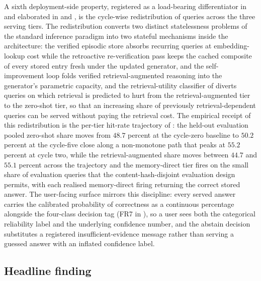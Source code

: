A sixth deployment-side property, registered as a load-bearing differentiator in  and elaborated in  and , is the cycle-wise redistribution of queries across the three serving tiers. The redistribution converts two distinct statelessness problems of the standard inference paradigm into two stateful mechanisms inside the architecture: the verified episodic store absorbs recurring queries at embedding-lookup cost while the retroactive re-verification pass keeps the cached composite of every stored entry fresh under the updated generator, and the self-improvement loop folds verified retrieval-augmented reasoning into the generator's parametric capacity, and the retrieval-utility classifier of  diverts queries on which retrieval is predicted to hurt from the retrieval-augmented tier to the zero-shot tier, so that an increasing share of previously retrieval-dependent queries can be served without paying the retrieval cost. The empirical receipt of this redistribution is the per-tier hit-rate trajectory of : the held-out evaluation pooled zero-shot share moves from $48.7$ percent at the cycle-zero baseline to $50.2$ percent at the cycle-five close along a non-monotone path that peaks at $55.2$ percent at cycle two, while the retrieval-augmented share moves between $44.7$ and $55.1$ percent across the trajectory and the memory-direct tier fires on the small share of evaluation queries that the content-hash-disjoint evaluation design permits, with each realised memory-direct firing returning the correct stored answer. The user-facing surface mirrors this discipline: every served answer carries the calibrated probability of correctness as a continuous percentage alongside the four-class decision tag (FR7 in ), so a user sees both the categorical reliability label and the underlying confidence number, and the abstain decision substitutes a registered insufficient-evidence message rather than serving a guessed answer with an inflated confidence label.

\subsection{Headline finding}
\label{sec:concl-headline}


